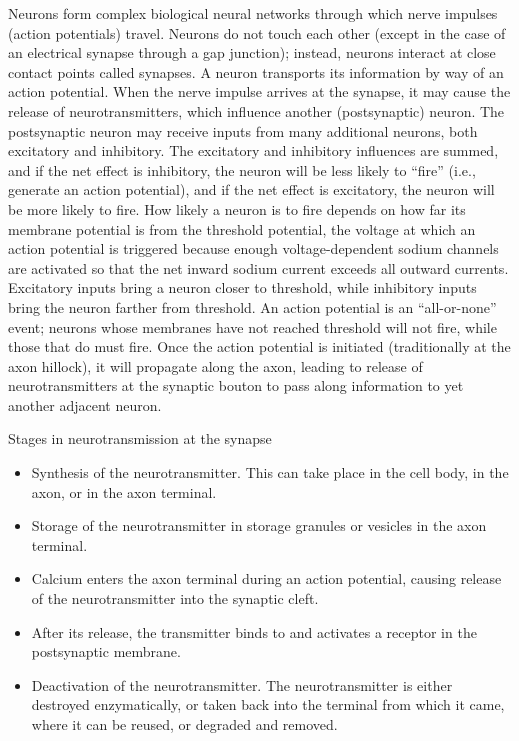 Neurons form complex biological neural networks through which nerve impulses (action potentials) travel. Neurons do not touch each other (except in the case of an electrical synapse through a gap junction); instead, neurons interact at close contact points called synapses. A neuron transports its information by way of an action potential. When the nerve impulse arrives at the synapse, it may cause the release of neurotransmitters, which influence another (postsynaptic) neuron. The postsynaptic neuron may receive inputs from many additional neurons, both excitatory and inhibitory. The excitatory and inhibitory influences are summed, and if the net effect is inhibitory, the neuron will be less likely to ``fire'' (i.e., generate an action potential), and if the net effect is excitatory, the neuron will be more likely to fire. How likely a neuron is to fire depends on how far its membrane potential is from the threshold potential, the voltage at which an action potential is triggered because enough voltage-dependent sodium channels are activated so that the net inward sodium current exceeds all outward currents. Excitatory inputs bring a neuron closer to threshold, while inhibitory inputs bring the neuron farther from threshold. An action potential is an ``all-or-none'' event; neurons whose membranes have not reached threshold will not fire, while those that do must fire. Once the action potential is initiated (traditionally at the axon hillock), it will propagate along the axon, leading to release of neurotransmitters at the synaptic bouton to pass along information to yet another adjacent neuron.

Stages in neurotransmission at the synapse

\begin{itemize}
\tightlist
\item
  Synthesis of the neurotransmitter. This can take place in the cell body, in the axon, or in the axon terminal.
\item
  Storage of the neurotransmitter in storage granules or vesicles in the axon terminal.
\item
  Calcium enters the axon terminal during an action potential, causing release of the neurotransmitter into the synaptic cleft.
\item
  After its release, the transmitter binds to and activates a receptor in the postsynaptic membrane.
\item
  Deactivation of the neurotransmitter. The neurotransmitter is either destroyed enzymatically, or taken back into the terminal from which it came, where it can be reused, or degraded and removed.
\end{itemize}

